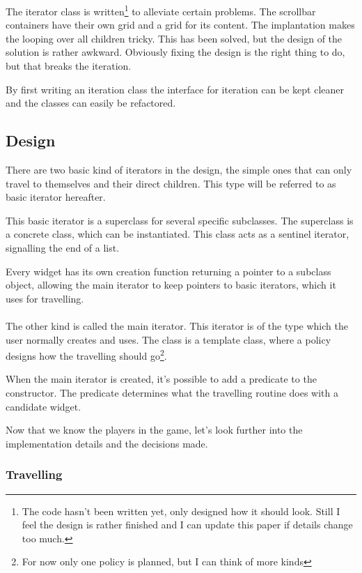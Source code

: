 The iterator class is written\footnote{The code hasn't been written yet, only
designed how it should look. Still I feel the design is rather finished and I
can update this paper if details change too much.} to alleviate certain
problems. The scrollbar containers have their own grid and a grid for its
content. The implantation makes the looping over all children tricky. This has
been solved, but the design of the solution is rather awkward. Obviously fixing
the design is the right thing to do, but that breaks the iteration.

By first writing an iteration class the interface for iteration can be kept
cleaner and the classes can easily be refactored.

\subsection{Design}

There are two basic kind of iterators in the design, the simple ones that can
only travel to themselves and their direct children. This type will be referred to
as basic iterator hereafter.

This basic iterator is a superclass for several specific subclasses. The
superclass is a concrete class, which can be instantiated. This class acts as a
sentinel iterator, signalling the end of a list.

Every widget has its own creation function returning a pointer to a subclass
object, allowing the main iterator to keep pointers to basic iterators, which it
uses for travelling.

\paragraph{}

The other kind is called the main iterator. This iterator is of the type which the user
normally creates and uses. The class is a template class, where a policy designs
how the travelling should go\footnote{For now only one policy is planned, but I
can think of more kinds}.

When the main iterator is created, it's possible to add a predicate to the
constructor. The predicate determines what the travelling routine does with a
candidate widget.

Now that we know the players in the game, let's look further into the implementation
details and the decisions made.

\subsubsection{Travelling}

